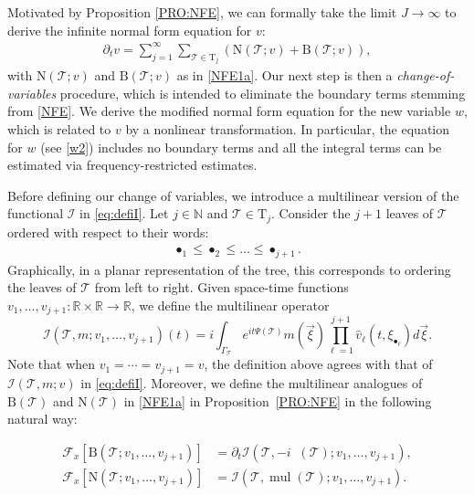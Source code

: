 \documentclass[a4paper,
11pt,  reqno]{amsart}
\newcommand{\5}{\textup{V}}
\newcommand{\noi}{\noindent}
\newcommand{\ft}{\widehat}
\newcommand{\dt}{\partial_t}
\theoremstyle{remark}
\newcommand{\R}{\mathbb{R}}
\newcommand{\bul}{\bullet}
\newcommand{\TT}{\mathcal{T}}
\newcommand{\Tr}{\mathrm{T}}
\newcommand{\Ft}{{\mathcal{F}}}
\renewcommand{\l}{\ell}
\newcommand{\N}{\mathbb{N}}
\DeclareMathOperator{\mul}{mul}
\DeclareMathOperator{\mulB}{mul_{\BB}}
\newcommand{\Ical}{\mathcal{I}}
\numberwithin{equation}{section}
\numberwithin{theorem}{section}
\newcommand{\NN}{\mathrm{N}}
\newcommand{\BB}{\mathrm{B}}
\begin{document}
Motivated by Proposition \ref{PRO:NFE}, we can formally take the limit $J\to \infty$ to derive the infinite normal form equation for $v$:
\begin{align}
\label{NFE}
\dt v= \sum_{j=1}^{\infty} \sum_{\TT\in \Tr_j} \left(\NN(\TT;v) +
\BB(\TT;v) \right)
,
\end{align}
with $\NN(\TT;v)$ and $\BB(\TT;v)$ as in \eqref{NFE1a}. Our next step is then a \emph{change-of-variables} procedure, which is intended to eliminate the boundary terms stemming from \eqref{NFE}. We derive the modified normal form equation for the new variable $w$, which is related to $v$ by a nonlinear transformation. In particular, the equation for $w$ (see \eqref{w2}) includes no boundary terms and all the integral terms can be estimated via frequency-restricted estimates.

Before defining our change of variables, we introduce a multilinear version of the functional $\Ical$ in \eqref{eq:defiI}.
Let $j\in \N$ and $\TT\in \Tr_j$. Consider the $j+1$ leaves of $\TT$ ordered with respect to their words:
\begin{align}
\label{lexic}
\bul_1\le \bul_2\le \dots \le \bul_{j+1}.
\end{align}
Graphically, in a
planar representation of the tree, this corresponds to ordering the leaves of
$\TT$ from left to right. Given space-time functions $v_1,\dots, v_{j+1}: \R \times \R \to \R$, we
define the multilinear operator
\begin{equation}\label{eq:defiImulti}
\Ical(\TT, m; v_1,\dots,v_{j+1}) (t)=i
\int_{\Gamma_\TT}
e^{it\Psi(\TT)}m(\vec{\xi}) \prod_{\ell
=1}^{j+1} \ft v_\l (t,\xi_{\bul_\ell}) d\vec{\xi}
.
\end{equation}
Note that
when $v_1 = \cdots = v_{j+1} = v$, the definition above agrees with that of $\Ical(\TT, m; v )$ in \eqref{eq:defiI}.  Moreover, we define the multilinear analogues of $\BB(\TT)$ and $\NN(\TT)$ in \eqref{NFE1a} in Proposition~\ref{PRO:NFE} in the following natural way:


\noi
\begin{align*}\Ft_x [\BB(\TT; v_1, \ldots, v_{j+1}) ]  &=
\dt\Ical (\TT,- i \mulB(\TT) ; v_1,\dots,v_{j+1}),\\
\Ft_x [\NN(\TT; v_1, \ldots, v_{j+1} ) ] 
&= 
\Ical(\TT,\mul(\TT) ; v_1, \ldots,
v_{j+1} )
.
\end{align*}
\end{document}
